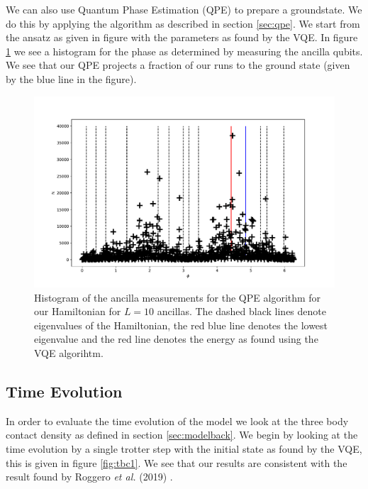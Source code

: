 \documentclass[10 pt, a4paper]{article}
\begin{document}
We can also use Quantum Phase Estimation (QPE) to prepare a groundstate. We do this by applying the algorithm as described in section \ref{sec:qpe}. We start from the ansatz as given in figure with the parameters as found by the VQE. In figure \ref{fig:qpe} we see a histogram for the phase as determined by measuring the ancilla qubits. We see that our QPE projects a fraction of our runs to the ground state (given by the blue line in the figure).

\begin{figure}[H]
\centering
	\includegraphics[width=\linewidth]{qpe}
\caption{Histogram of the ancilla measurements for the QPE algorithm for our Hamiltonian for $L = 10$ ancillas. The dashed black lines denote eigenvalues of the Hamiltonian, the red blue line denotes the lowest eigenvalue and the red line denotes the energy as found using the VQE algorihtm.} \label{fig:qpe}
\end{figure}



\subsection{Time Evolution}

In order to evaluate the time evolution of the model we look at the three body contact density as defined in section \ref{sec:modelback}. We begin by looking at the time evolution by a single trotter step with the initial state as found by the VQE, this is given in figure \ref{fig:tbc1}. We see that our results are consistent with the result found by Roggero \textit{et al.} (2019) \cite{neutscat}.
\end{document}
